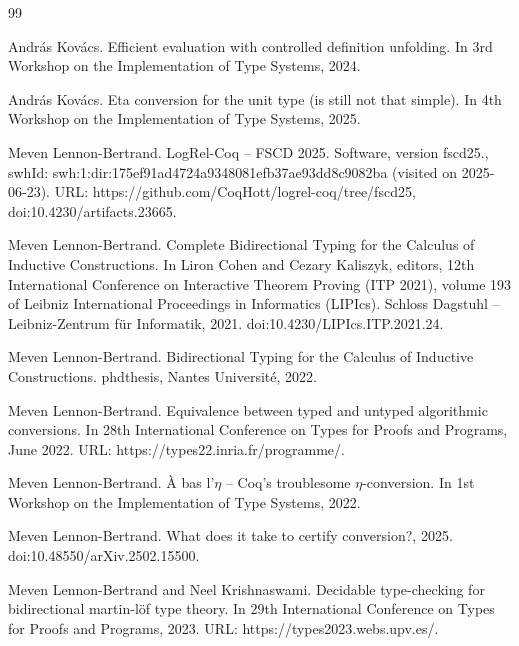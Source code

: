 \documentclass[10pt,a4paper]{amsart}
\begin{document}
\begin{thebibliography}{99}
\par\noindent  [27]  András Kovács.  Efficient evaluation with controlled definition unfolding.  In 3rd Workshop on the Implementation of Type Systems, 2024.  
 
\par\noindent  [28]  András Kovács.  Eta conversion for the unit type (is still not that simple).  In 4th Workshop on the Implementation of Type Systems, 2025.  
 
\par\noindent  [29]  Meven Lennon-Bertrand.  LogRel-Coq – FSCD 2025.  Software, version fscd25., swhId: swh:1:dir:175ef91ad4724a9348081efb37ae93dd8c9082ba (visited on 2025-06-23).  URL: https://github.com/CoqHott/logrel-coq/tree/fscd25, doi:10.4230/artifacts.23665.  
 
\par\noindent  [30]  Meven Lennon-Bertrand.  Complete Bidirectional Typing for the Calculus of Inductive Constructions.  In Liron Cohen and Cezary Kaliszyk, editors, 12th International Conference on Interactive Theorem Proving (ITP 2021), volume 193 of Leibniz International Proceedings in Informatics (LIPIcs). Schloss Dagstuhl – Leibniz-Zentrum für Informatik, 2021.  doi:10.4230/LIPIcs.ITP.2021.24.  
 
\par\noindent  [31]  Meven Lennon-Bertrand.  Bidirectional Typing for the Calculus of Inductive Constructions.  phdthesis, Nantes Université, 2022.  
 
\par\noindent  [32]  Meven Lennon-Bertrand.  Equivalence between typed and untyped algorithmic conversions.  In 28th International Conference on Types for Proofs and Programs, June 2022.  URL: https://types22.inria.fr/programme/.  
 
\par\noindent  [33]  Meven Lennon-Bertrand.  À bas l’$\eta$ – Coq’s troublesome $\eta$-conversion.  In 1st Workshop on the Implementation of Type Systems, 2022.  
 
\par\noindent  [34]  Meven Lennon-Bertrand.  What does it take to certify conversion?, 2025.  doi:10.48550/arXiv.2502.15500.  
 
\par\noindent  [35]  Meven Lennon-Bertrand and Neel Krishnaswami.  Decidable type-checking for bidirectional martin-löf type theory.  In 29th International Conference on Types for Proofs and Programs, 2023.  URL: https://types2023.webs.upv.es/.  
 

\end{thebibliography}
\end{document}
